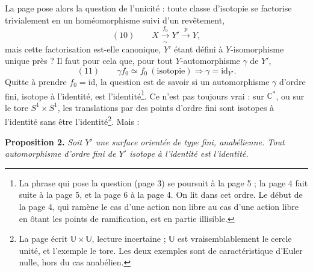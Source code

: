 \documentclass[11pt,a4paper]{article}
\begin{document}
La page pose alors la question de l'unicité : toute classe d'isotopie se
factorise trivialement en un homéomorphisme suivi d'un revêtement,
\[
(10)\qquad X \xrightarrow[\ \sim\ ]{\ f_0\ } Y' \xrightarrow{\ p\ } Y ,
\]
mais cette factorisation est-elle canonique, $Y'$ étant défini à
$Y$-isomorphisme unique près ? Il faut pour cela que, pour tout
$Y$-automorphisme $\gamma$ de $Y'$,
\[
(11)\qquad \gamma f_0 \simeq f_0 \ (\text{isotopie}) \Longrightarrow \gamma = \mathrm{id}_{Y'} .
\]
Quitte à prendre $f_0 = \mathrm{id}$, la question est de savoir si un
automorphisme $\gamma$ d'ordre fini, isotope à l'identité, est
l'identité\footnote{La phrase qui pose la question (page 3) se poursuit à la
page 5 ; la page 4 fait suite à la page 5, et la page 6 à la page 4. On lit
dans cet ordre. Le début de la page 4, qui ramène le cas d'une action non libre
au cas d'une action libre en ôtant les points de ramification, est en partie
illisible.}. Ce n'est pas toujours vrai : sur $\mathbb{C}^{*}$, ou sur le tore
$S^1 \times S^1$, les translations par des points d'ordre fini sont isotopes à
l'identité sans être l'identité\footnote{La page écrit
$\mathbb{U} \times \mathbb{U}$, lecture incertaine ; $\mathbb{U}$ est
vraisemblablement le cercle unité, et l'exemple le tore. Les deux exemples sont
de caractéristique d'Euler nulle, hors du cas anabélien.}. Mais :

\textbf{Proposition 2.} \emph{Soit $Y'$ une surface orientée de type fini,
anabélienne. Tout automorphisme d'ordre fini de $Y'$ isotope à l'identité est
l'identité.}
\end{document}

